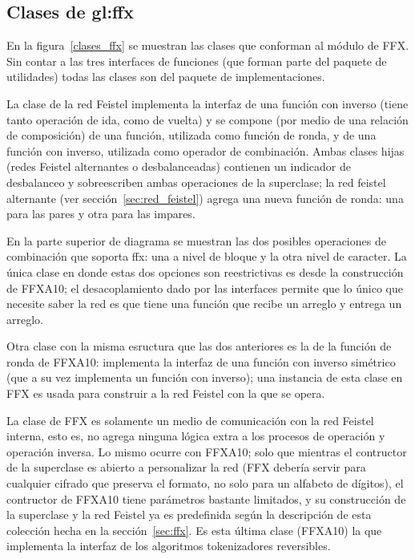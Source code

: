 %
%
%

\subsection{Clases de \texorpdfstring{\acrshort{gl:ffx}}{FFX}}

En la figura~\ref{clases_ffx} se muestran las clases que conforman al módulo de
FFX. Sin contar a las tres interfaces de funciones (que forman parte del paquete
de utilidades) todas las clases son del paquete de implementaciones.

La clase de la red Feistel implementa la interfaz de una función con inverso
(tiene tanto operación de ida, como de vuelta) y se compone (por medio de una
relación de composición) de una función, utilizada como función de ronda, y de
una función con inverso, utilizada como operador de combinación. Ambas clases
hijas (redes Feistel alternantes o desbalanceadas) contienen un indicador de
desbalanceo y sobreescriben ambas operaciones de la superclase; la red feistel
alternante (ver sección~\ref{sec:red_feistel}) agrega una nueva función
de ronda: una para las pares y otra para las impares.

En la parte superior de diagrama se muestran las dos posibles operaciones de
combinación que soporta ffx: una a nivel de bloque y la otra nivel de caracter.
La única clase en donde estas dos opciones son reestrictivas es desde la
construcción de FFXA10; el desacoplamiento dado por las interfaces permite que
lo único que necesite saber la red es que tiene una función que recibe un
arreglo y entrega un arreglo.

Otra clase con la misma esructura que las dos anteriores es la de la función de
ronda de FFXA10: implementa la interfaz de una función con inverso simétrico
(que a su vez implementa un función con inverso); una instancia de esta clase
en FFX es usada para construir a la red Feistel con la que se opera.

La clase de FFX es solamente un medio de comunicación con la red Feistel
interna, esto es, no agrega ninguna lógica extra a los procesos de operación y
operación inversa. Lo mismo ocurre con FFXA10; solo que mientras el contructor
de la superclase es abierto a personalizar la red (FFX debería servir para
cualquier cifrado que preserva el formato, no solo para un alfabeto de
dígitos), el contructor de FFXA10 tiene parámetros bastante limitados, y su
construcción de la superclase y la red Feistel ya es predefinida según la
descripción de esta colección hecha en la sección~\ref{sec:ffx}. Es esta última
clase (FFXA10) la que implementa la interfaz de los algoritmos tokenizadores
reversibles.

